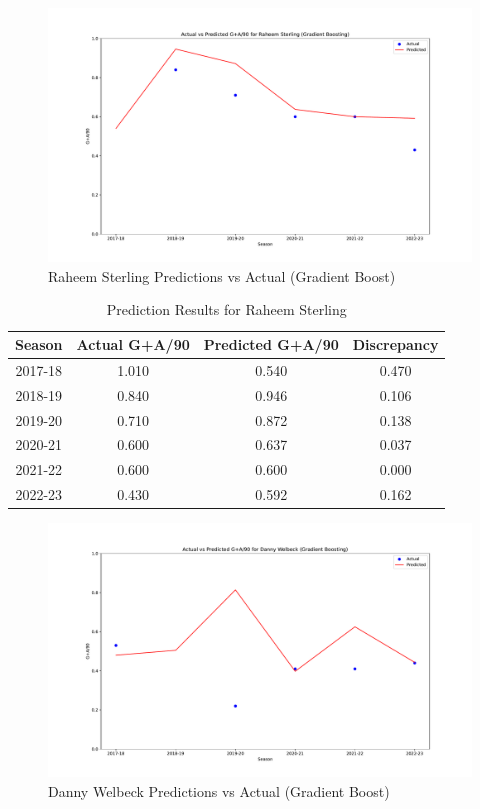 \documentclass[12pt]{article}
\begin{document}

\begin{figure}[H]
  \centering
  \includegraphics[width=1\textwidth]{GradBoost_Sterling.pdf}
  \caption{Raheem Sterling Predictions vs Actual (Gradient Boost)}
  \label{fig:Sterling_graph}
  \end{figure}


  \begin{table}[H]
    \centering
    \begin{tabular}{|c|c|c|c|}
    \hline
    \textbf{Season} & \textbf{Actual G+A/90} & \textbf{Predicted G+A/90} & \textbf{Discrepancy} \\
    \hline
    2017-18 & 1.010 & 0.540 & 0.470 \\
    2018-19 & 0.840 & 0.946 & 0.106 \\
    2019-20 & 0.710 & 0.872 & 0.138 \\
    2020-21 & 0.600 & 0.637 & 0.037 \\
    2021-22 & 0.600 & 0.600 & 0.000 \\
    2022-23 & 0.430 & 0.592 & 0.162 \\
    \hline
    \end{tabular}
    \caption{Prediction Results for Raheem Sterling}
    \label{tab:sterling_prediction_results}
  \end{table}

  \begin{figure}[H]
    \centering
    \includegraphics[width=1\textwidth]{GradBoost_Welbeck.pdf}
    \caption{Danny Welbeck Predictions vs Actual (Gradient Boost)}
    \label{fig:Welbeck_graph}
    \end{figure}
\end{document}
